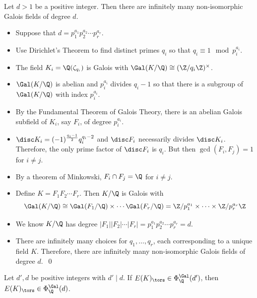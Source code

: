 \begin{frame}[plain]
\begin{lem}
Let $d>1$ be a positive integer. Then there are infinitely many non-isomorphic Galois fields of degree $d$. 
\end{lem}

\pfsk
\begin{itemize}
\item Suppose that $d= p_1^{a_1}p_2^{a_2} \cdots p_r^{a_r}$.
\item Use Dirichlet's Theorem to find distinct primes $q_i$ so that $q_i \equiv 1 \mod p_i^{a_i}$.
\item The field $K_i= \Q(\zeta_{q_i})$ is Galois with $\Gal(K/\Q) \cong (\Z/q_i\Z)^\times$.
\item $\Gal(K/\Q)$ is abelian and $p_i^{a_i}$ divides $q_i - 1$ so that there is a subgroup of $\Gal(K/\Q)$ with index $p_i^{a_i}$.
\item By the Fundamental Theorem of Galois Theory, there is an abelian Galois subfield of $K_i$, say $F_i$, of degree $p_i^{a_i}$.
\item $\disc K_i= (-1)^{\frac{q_i-1}{2}} q_i^{q_i - 2}$ and $\disc F_i$ necessarily divides $\disc K_i$. Therefore, the only prime factor of $\disc F_i$ is $q_i$. But then $\gcd(F_i,F_j)= 1$ for $i \neq j$.
\item By a theorem of Minkowski, $F_i \cap F_j= \Q$ for $i \neq j$.
\end{itemize}
\end{frame}





\begin{frame}[plain]
\begin{itemize}
\item Define $K= F_1F_2\cdots F_r$. Then $K/\Q$ is Galois with 
	\[
	\Gal(K/\Q) \cong \Gal(F_1/\Q) \times \cdots \Gal(F_r/\Q)= \Z/p_1^{a_1} \times \cdots \times \Z/p_r^{a_r}\Z
	\]
\item We know $K/\Q$ has degree $|F_1| |F_2| \cdots |F_r|= p_1^{a_1} p_2^{a_2} \cdots p_r^{a_r}= d$.
\item There are infinitely many choices for $q_1,\ldots,q_r$, each corresponding to a unique field $K$. Therefore, there are infinitely many non-isomorphic Galois fields of degree $d$.~\hfill\qed
\end{itemize}

\begin{prop} 
Let $d', d$ be positive integers with $d' \mid d$. If $E(K)_\tors \in \Phi_\Q^{\Gal}(d')$, then $E(K)_\tors \in \Phi_\Q^{\Gal}(d)$.
\end{prop}
\end{frame}





